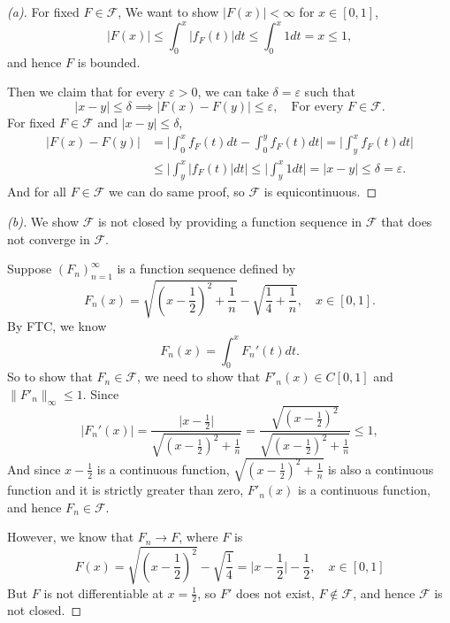 \begin{proof}[(a)]
    For fixed $F \in \mathcal F$,
    We want to show $\vert F(x) \vert < \infty$ for $x \in [0,1]$,
    \[
        \lvert F(x)\rvert \le \int_{0}^x \lvert f_F(t) \rvert dt \le \int_{0}^x 1 dt = x \le 1,
    \]
    and hence $F$ is bounded.

    Then we claim that for every $\varepsilon > 0$, we can take $\delta = \varepsilon$ such that
    \[
        \lvert x-y \rvert \le \delta \implies \lvert F(x) - F(y)\rvert \le \varepsilon, \quad \text{For every }F \in \mathcal F.
    \]
    For fixed $F \in \mathcal F$ and $\lvert x - y \rvert \le \delta$,
    \[
        \begin{aligned}
        \lvert F(x) - F(y)\rvert &= \lvert \int_0^x f_F(t)dt - \int_0^y f_F(t)dt \rvert = \lvert \int_y^x f_F(t)dt \rvert \\ 
        &\le \lvert \int_y^x \lvert f_F(t) \rvert dt \rvert \le \lvert \int_y^x 1 dt \rvert = \lvert x-y\rvert \le \delta = \varepsilon.
        \end{aligned}
    \]
    And for all $F \in \mathcal F$ we can do same proof, so $\mathcal F$ is equicontinuous.
\end{proof}

\begin{proof}[(b)]
    We show $\mathcal F$ is not closed by providing a function sequence in $\mathcal{F}$ that does not converge in $\mathcal F$.

    Suppose $(F_n)_{n=1}^\infty$ is a function sequence defined by 
    \[
        F_n(x) = \sqrt{(x-\frac{1}{2})^2 + \frac{1}{n}} - \sqrt{\frac{1}{4} + \frac{1}{n}}, \quad x \in [0,1]. 
    \]
    By FTC, we know 
    \[
        F_n(x) = \int_0^x F_n'(t) dt. 
    \]
    So to show that $F_n \in \mathcal F$, we need to show that $F'_n(x) \in C[0,1]$ and $\| F'_n\|_\infty \le 1$.
    Since 
    \[
        \lvert F_n'(x) \rvert = \frac{\lvert x - \frac{1}{2} \lvert }{\sqrt{(x-\frac{1}{2})^2 + \frac{1}{n}}} = \frac{\sqrt{(x - \frac{1}{2})^2}}{\sqrt{(x-\frac{1}{2})^2 + \frac{1}{n}}} \le 1,
    \]
    And since $x - \frac{1}{2}$ is a continuous function, $\sqrt{(x-\frac{1}{2})^2 + \frac{1}{n}}$ is also a continuous function and it is strictly greater than zero, $F'_n(x)$ is a continuous function, and hence $F_n \in \mathcal F$.

    However, we know that $F_n \to F$, where $F$ is
    \[
        F(x) = \sqrt{(x-\frac{1}{2})^2} - \sqrt{\frac{1}{4}} = \lvert x-\frac{1}{2} \rvert - \frac{1}{2}, \quad x \in [0,1]
    \] 
    But $F$ is not differentiable at $x = \frac{1}{2}$, so $F'$ does not exist, $F \notin \mathcal F$, and hence $\mathcal F$ is not closed.
\end{proof}


